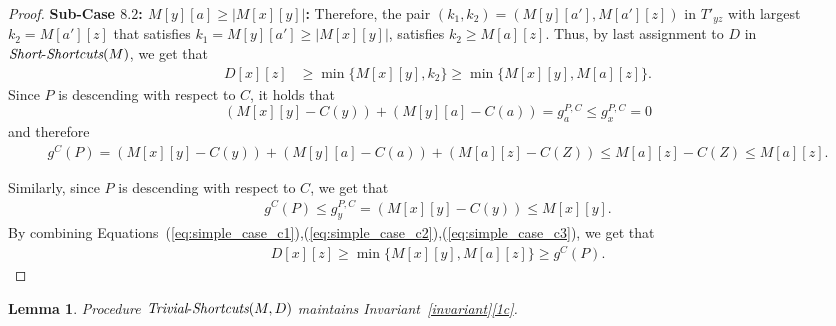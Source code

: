 \documentclass[11pt]{article}
\newtheorem{lemma}[theorem]{Lemma}
\newcommand{\Simple}{\mbox{{\it Short}-{\it Shortcuts}}}
\newcommand{\Trivial}{\mbox{{\it Trivial}-{\it Shortcuts}}}
\begin{document}
\begin{proof}
    \textbf{Sub-Case $8.2$: $M[y][a]\ge |M[x][y]|$:} Therefore, the pair $(k_1,k_2) = (M[y][a'], M[a'][z])$ in $T'_{yz}$ with largest $k_2=M[a'][z]$ that satisfies $k_1=M[y][a'] \ge |M[x][y]|$, satisfies $k_2 \ge M[a][z]$. Thus, by last assignment to $D$ in $\Simple(M)$, we get that
    \begin{align}\label{eq:simple_case_c1}
        D[x][z] &\ge \min \{ M[x][y], k_2 \}
        \ge
        \min \{ M[x][y], M[a][z] \}.
    \end{align}
    Since $P$ is descending with respect to $C$, it holds that $$(M[x][y]-C(y)) + (M[y][a]-C(a)) = g^{P,C}_a \le g^{P,C}_x = 0$$
    and therefore 
    \begin{align}\label{eq:simple_case_c2}
      g^C(P) = (M[x][y]-C(y)) + (M[y][a]-C(a)) + (M[a][z]-C(Z))  \le M[a][z]-C(Z) \le M[a][z].  
    \end{align}
    
    Similarly, since $P$ is descending with respect to $C$, we get that
    \begin{align}\label{eq:simple_case_c3}
       g^C(P) \le g^{P,C}_y =  (M[x][y]-C(y))  \le M[x][y]. 
    \end{align}
    By combining Equations~(\ref{eq:simple_case_c1}),(\ref{eq:simple_case_c2}),(\ref{eq:simple_case_c3}), we get that
    \begin{align*}
        D[x][z] \ge
        \min \{ M[x][y], M[a][z] \} \ge 
        g^C(P).
    \end{align*}
\end{proof}


\begin{lemma}\label{lemma:trivial-shortcuts-invariant}
    Procedure $\Trivial(M,D)$ maintains Invariant~\ref{invariant}\ref{1c}.
\end{lemma}
\end{document}
